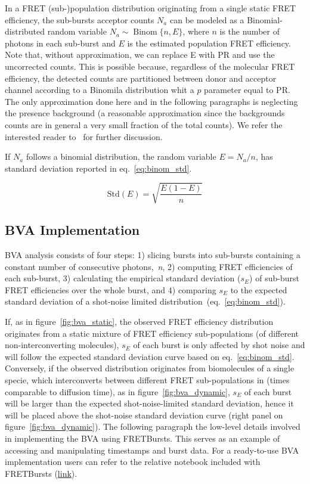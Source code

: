 In a FRET (sub-)population distribution originating from a single static FRET efficiency,
the sub-bursts acceptor counts $N_a$ can be modeled as a Binomial-distributed random variable 
$N_a \sim \operatorname{Binom} \{n, E\}$, where $n$ is the number of photons in each sub-burst and 
$E$ is the estimated population FRET efficiency. Note that, without approximation, we can replace 
E with PR and use the uncorrected counts. This is possible because, regardless of the 
molecular FRET efficiency, the detected counts are partitioned between donor and acceptor channel
according to a Binomila distribution whit a $p$ parameter equal to PR.
The only approximation done here and in the following paragraphs is neglecting the presence background
(a reasonable approximation since the backgrounds counts are in general a very small fraction of
the total counts). 
We refer the interested reader to~\cite{Torella_2011} for further discussion.

If $N_a$ follows a binomial distribution, the random variable $E = N_a/n$,
has standard deviation reported in eq.~\ref{eq:binom_std}. 


\begin{equation}
\label{eq:binom_std}
\operatorname{Std(\textit{E})} = {\sqrt{\frac{E(1 - E)}{n}}}
\end{equation}

\subsection{BVA Implementation}
BVA analysis consists of four steps: 1) slicing bursts into sub-bursts containing a constant number of consecutive photons,~\textit{n}, 2) computing FRET efficiencies of each sub-burst, 3) calculating the empirical standard deviation ($s_E$) of sub-burst FRET efficiencies over the whole burst, and 4) comparing $s_E$ to the expected standard deviation of a shot-noise limited distribution~(eq.~\ref{eq:binom_std}).

If, as in figure~\ref{fig:bva_static}, the observed FRET efficiency distribution 
originates from a static mixture of FRET efficiency sub-populations (of different 
non-interconverting molecules), 
$s_E$ of each burst is only affected by shot noise and will follow the expected standard deviation curve based on eq.~\ref{eq:binom_std}. 
Conversely, if the observed distribution originates from biomolecules of a single specie, which 
interconverts between different FRET sub-populations in (times comparable to diffusion 
time), as in figure~\ref{fig:bva_dynamic}, $s_E$ of each burst will be larger than the expected 
shot-noise-limited standard deviation, hence it will be placed above the shot-noise standard 
deviation curve (right panel on figure~\ref{fig:bva_dynamic}).
The following paragraph the low-level details involved in implementing the BVA using FRETBursts.
This serves as an example of accessing and manipulating timestamps and burst data.
For a ready-to-use BVA implementation users can refer to the relative notebook included with FRETBursts
(\href{http://nbviewer.jupyter.org/github/tritemio/FRETBursts_notebooks/blob/master/notebooks/Example%20-%20Burst%20Variance%20Analysis.ipynb}{link}).


